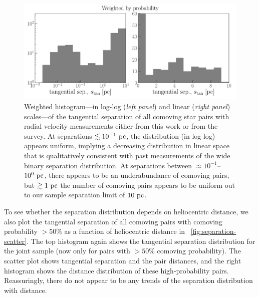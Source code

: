 \documentclass[modern, letterpaper]{aastex61}
\begin{document}
\begin{figure}[htb]
  \begin{center}
    \includegraphics[width=\linewidth]{separation-hist.pdf}
  \end{center}
  \caption{%
    Weighted histogram---in log-log (\emph{left panel}) and linear (\emph{right
    panel}) scales---of the tangential separation of all comoving star pairs
    with radial velocity measurements either from this work or from the
     survey.
    At separations $\lesssim 10^{-1}~\mathrm{pc}$, the distribution (in log-log) appears
    uniform, implying a decreasing distribution in linear space that is
    qualitatively consistent with past measurements of the wide binary
    separation distribution.
    At separations between $\approx 10^{-1}$--$10^{0}~\mathrm{pc}$, there appears to be
    an underabundance of comoving pairs, but $\gtrsim 1~\mathrm{pc}$ the number of
    comoving pairs appears to be uniform out to our sample separation limit of
    $10~\mathrm{pc}$.
    \label{fig:separation}}
\end{figure}

To see whether the separation distribution depends on heliocentric distance, we
also plot the tangential separation of all comoving pairs with comoving
probability $> 50\%$ as a function of heliocentric distance in
\figurename~\ref{fig:separation-scatter}.
The top histogram again shows the tangential separation distribution for the
joint sample (now only for pairs with $> 50\%$ comoving probability).
The scatter plot shows tangential separation and the pair distances, and
the right histogram shows the distance distribution of these high-probability
pairs.
Reassuringly, there do not appear to be any trends of the separation
distribution with distance.
\end{document}
